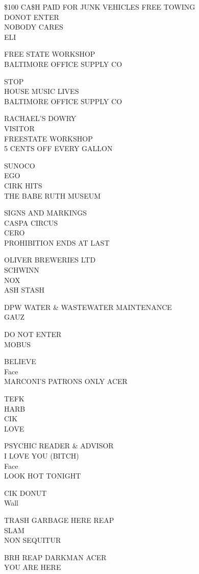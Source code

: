 \documentclass[10pt,letterpaper]{article}
\begin{document}
\$100 CA\$H PAID FOR JUNK VEHICLES FREE TOWING\\
DONOT ENTER\\
NOBODY CARES\\
ELI

FREE STATE WORKSHOP\\
BALTIMORE OFFICE SUPPLY CO

STOP\\
HOUSE MUSIC LIVES\\
BALTIMORE OFFICE SUPPLY CO

RACHAEL'S DOWRY\\
VISITOR\\
FREESTATE WORKSHOP\\
5 CENTS OFF EVERY GALLON

SUNOCO\\
EGO\\
CIRK HITS\\
THE BABE RUTH MUSEUM

SIGNS AND MARKINGS\\
CASPA CIRCUS\\
CERO\\
PROHIBITION ENDS AT LAST

OLIVER BREWERIES LTD\\
SCHWINN\\
NOX\\
ASH STASH

DPW WATER \& WASTEWATER MAINTENANCE\\
GAUZ

DO NOT ENTER\\
MOBUS

BELIEVE\\
Face\\
MARCONI'S PATRONS ONLY ACER

TEFK\\
HARB\\
CIK\\
LOVE

PSYCHIC READER \& ADVISOR\\
I LOVE YOU (BITCH)\\
Face\\
LOOK HOT TONIGHT

CIK DONUT\\
Wall

TRASH GARBAGE HERE REAP\\
SLAM\\
NON SEQUITUR

BRH REAP DARKMAN ACER\\
YOU ARE HERE
\pagebreak
\end{document}
